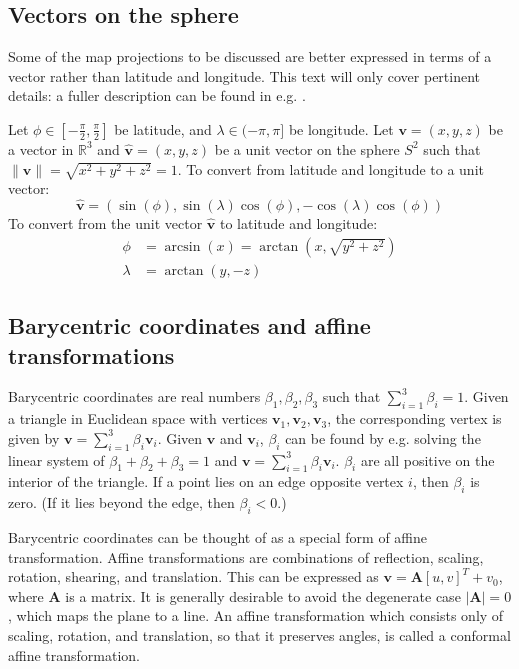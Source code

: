 \documentclass{amsart}[12pt]
\begin{document}
\subsection{Vectors on the sphere}
Some of the map projections to be discussed are better expressed
in terms of a vector rather than latitude and longitude. This text will only
cover pertinent details: a fuller description can be found in e.g. \cite{strang80}.

Let $\phi \in [-\frac{\pi}{2}, \frac{\pi}{2}]$ be latitude, and
$\lambda \in (-\pi, \pi]$ be longitude. Let $\mathbf v = (x, y, z)$ be a vector
in $\mathbb R^3$ and $\mathbf{\hat{v}} = (x, y, z)$ be a unit vector on the
sphere $S^2$ such that $\| \mathbf{\hat{v}} \| = \sqrt{x^2 + y^2 +z^2} = 1$.
To convert from latitude and longitude to a unit vector:
\begin{equation}
  \mathbf{\hat{v}} = \left(\sin (\phi), \sin (\lambda) \cos (\phi),
  -\cos (\lambda) \cos (\phi) \right)
\end{equation}
To convert from the unit vector $\mathbf{\hat{v}}$ to latitude and longitude:
\begin{equation}\begin{split}
  \phi &= \arcsin (x) = \arctan (x, \sqrt{y^2 + z^2}) \\
  \lambda &= \arctan (y, -z)
\end{split}\end{equation}

\subsection{Barycentric coordinates and affine transformations}

Barycentric coordinates are real numbers $\beta_1, \beta_2, \beta_3$ such that $\sum^3_{i=1} \beta_i = 1$. Given a triangle in Euclidean space with vertices $\mathbf v_1, \mathbf v_2, \mathbf v_3$, the corresponding vertex is given by $\mathbf v = \sum^3_{i=1} \beta_i \mathbf v_i$. Given $\mathbf v$ and $\mathbf v_i$, $\beta_i$ can be found by e.g. solving the linear system of $\beta_1 + \beta_2 + \beta_3 = 1$ and $\mathbf v = \sum^3_{i=1} \beta_i \mathbf v_i$. $\beta_i$ are all positive on the interior of the triangle. If a point lies on an edge opposite vertex $i$, then $\beta_i$ is zero. (If it lies beyond the edge, then $\beta_i < 0$.)

Barycentric coordinates can be thought of as a special form of affine transformation. Affine transformations are combinations of reflection, scaling, rotation, shearing, and translation. This can be expressed as $\mathbf v = \mathbf A [u, v]^T + v_0$, where $\mathbf A$ is a matrix. It is generally desirable to avoid the degenerate case $|\mathbf A| = 0$, which maps the plane to a line. An affine transformation which consists only of scaling, rotation, and translation, so that it preserves angles, is called a conformal affine transformation.
\end{document}
